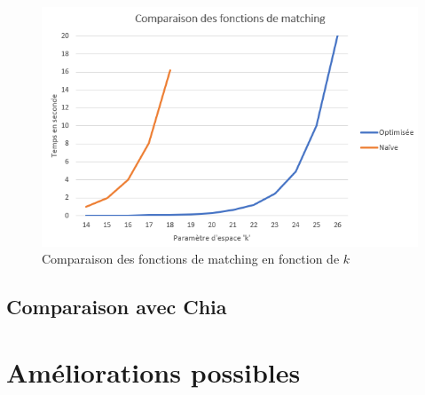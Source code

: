\begin{figure}[H]
  \centering
  \includegraphics[width=14cm]{images/bench_matching.png}
  \caption{Comparaison des fonctions de matching en fonction de $k$}
\end{figure}

\subsection{Comparaison avec Chia}

\section{Améliorations possibles}

\lipsum[1]